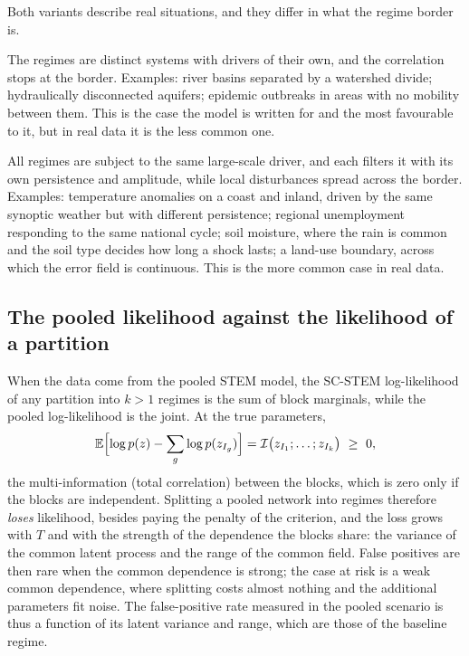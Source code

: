 \documentclass[11pt]{article}
\newcommand{\E}{\mathbb{E}}
\begin{document}
Both variants describe real situations, and they differ in what the regime border is.
\begin{description}[leftmargin=1.5em]
  \item[Independent: the border is a barrier.] The regimes are distinct systems with drivers of their own, and the correlation stops at the border. Examples: river basins separated by a watershed divide; hydraulically disconnected aquifers; epidemic outbreaks in areas with no mobility between them. This is the case the model is written for and the most favourable to it, but in real data it is the less common one.
  \item[Shared: the border is a change of response, not a barrier.] All regimes are subject to the same large-scale driver, and each filters it with its own persistence and amplitude, while local disturbances spread across the border. Examples: temperature anomalies on a coast and inland, driven by the same synoptic weather but with different persistence; regional unemployment responding to the same national cycle; soil moisture, where the rain is common and the soil type decides how long a shock lasts; a land-use boundary, across which the error field is continuous. This is the more common case in real data.
\end{description}

\subsection{The pooled likelihood against the likelihood of a partition}\label{sec:mi}

When the data come from the pooled STEM model, the SC-STEM log-likelihood of any partition into $k > 1$ regimes is the sum of block marginals, while the pooled log-likelihood is the joint. At the true parameters,
\begin{equation}\label{eq:mi}
  \E\Bigl[\log p(z) - \sum_{g} \log p(z_{I_g})\Bigr] = \mathcal{I}\bigl(z_{I_1}; \dots; z_{I_k}\bigr) \ \ge\ 0,
\end{equation}
the multi-information (total correlation) between the blocks, which is zero only if the blocks are independent. Splitting a pooled network into regimes therefore \emph{loses} likelihood, besides paying the penalty of the criterion, and the loss grows with $T$ and with the strength of the dependence the blocks share: the variance of the common latent process and the range of the common field. False positives are then rare when the common dependence is strong; the case at risk is a weak common dependence, where splitting costs almost nothing and the additional parameters fit noise. The false-positive rate measured in the pooled scenario is thus a function of its latent variance and range, which are those of the baseline regime.
\end{document}
